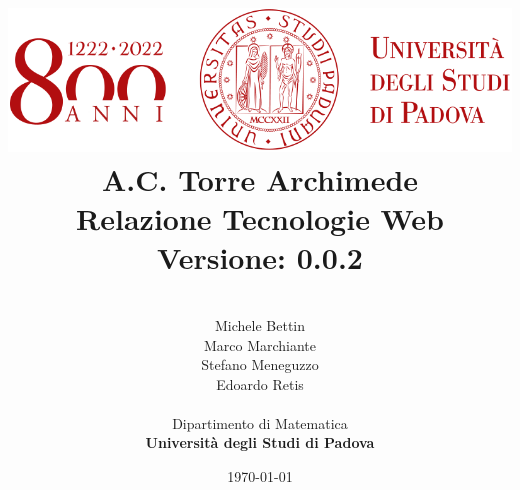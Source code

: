 \pagestyle{fancy}
    \fancyhf{}
    
    
\title{
    \includegraphics[scale=0.5]{images/logo.png} \\
    \vspace*{1in}
    {
        \Huge \textbf{A.C. Torre Archimede}}\\
        \vspace*{0.25in}
        \textbf{Relazione Tecnologie Web}\\
        \vspace{0.2in}
        \textbf{Versione: 0.0.2}\\
        \vspace{0.1in}
    }

\author{
    \begin{tabular}[t]{c@{}c}
        \hline
        \\
        Michele Bettin \\
        Marco Marchiante \\
        Stefano Meneguzzo\\
        Edoardo Retis\\
    \end{tabular}
    \vspace*{0.5in} \\
    Dipartimento di Matematica \\
    \textbf{Università degli Studi di Padova} \\
} 
\date{\today}


\setlength{\oddsidemargin}{0in} \setlength{\evensidemargin}{0in}
\setlength{\topmargin}{0in}     \setlength{\headsep}{.25in}
\setlength{\textwidth}{6.5in}   \setlength{\textheight}{8.5in}
\setlength{\parindent}{1cm}